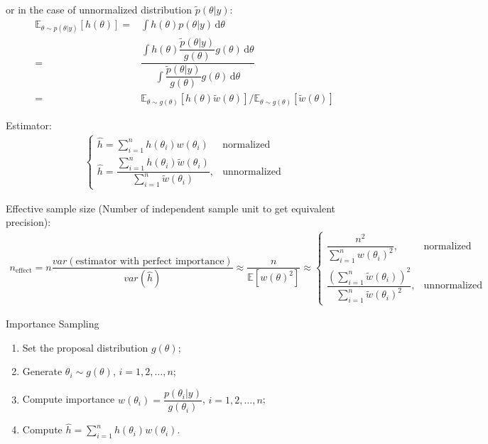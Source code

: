 or in the case of unnormalized distribution $ \tilde{p}(\theta |y) $:
\begin{align}
    \mathbb{E}_{\theta \sim p(\theta |y)}\left[ h(\theta ) \right] = & \int h(\theta )p(\theta |y)\,\mathrm{d}\theta  \\
    =& \dfrac{ \int h(\theta )\dfrac{ \tilde{p}(\theta |y) }{ g(\theta ) } g(\theta )\,\mathrm{d}\theta  }{ \int \dfrac{ \tilde{p}(\theta |y) }{ g(\theta ) } g(\theta )\,\mathrm{d}\theta  } \\
    =& \mathbb{E}_{\theta \sim g(\theta )}\left[ h(\theta )\tilde{w}(\theta )  \right] \Big/ \mathbb{E}_{\theta \sim g(\theta )}\left[ \tilde{w}(\theta )  \right]
\end{align}

Estimator:
\begin{align}
    \begin{cases}
        \hat{h}= \sum_{i=1}^{n}h(\theta _i)w(\theta _i) & \text{normalized} \\
        \hat{h}=\dfrac{ \sum_{i=1}^{n}h(\theta _i)\tilde{w}(\theta _i) }{ \sum_{i=1}^{n}\tilde{w}(\theta _i) } , & \text{unnormalized}
    \end{cases} 
\end{align}

Effective sample size (Number of independent sample unit to get equivalent precision): 
\begin{align}
    n_\text{effect}= n\dfrac{ var(\text{estimator with perfect importance}) }{ var(\hat{h}) }\approx \dfrac{ n }{ \mathbb{E}\left[ w(\theta )^2 \right]  }\approx\begin{cases}
        \dfrac{ n^2 }{ \sum_{i=1}^{n}w(\theta _i)^2 }   ,& \text{normalized} \\
        \dfrac{ (\sum_{i=1}^{n}\tilde{w}(\theta _i))^2 }{ \sum_{i=1}^{n}\tilde{w}(\theta _i)^2 } , & \text{unnormalized}
    \end{cases} 
\end{align}

\begin{algorithm}{Importance Sampling}
    \begin{enumerate}[topsep=2pt,itemsep=0pt]
        \item Set the proposal distribution $ g(\theta ) $;
        \item Generate $ \theta _i\sim g(\theta ) $, $ i=1,2,\ldots,n $;
        \item Compute importance $ w(\theta _i)=\dfrac{ p(\theta _i|y) }{ g(\theta _i) } $, $ i=1,2,\ldots,n $;
        \item Compute $ \hat{h}=\sum_{i=1}^{n}h(\theta _i)w(\theta _i) $.
    \end{enumerate}
\end{algorithm}










